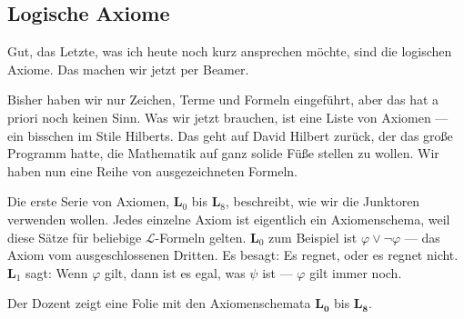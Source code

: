 \begin{ai-global-state-checkpoint-invisible-content}
\end{ai-global-state-checkpoint-invisible-content}

\subsection{Logische Axiome}

\begin{spoken-clean}[01:22:27 - 01:25:27]
Gut, das Letzte, was ich heute noch kurz ansprechen möchte, sind die logischen Axiome. Das machen wir jetzt per Beamer. 

Bisher haben wir nur Zeichen, Terme und Formeln eingeführt, aber das hat a priori noch keinen Sinn. Was wir jetzt brauchen, ist eine Liste von Axiomen --- ein bisschen im Stile Hilberts. Das geht auf David Hilbert zurück, der das große Programm hatte, die Mathematik auf ganz solide Füße stellen zu wollen. Wir haben nun eine Reihe von ausgezeichneten Formeln.

Die erste Serie von Axiomen, \textbf{L$_0$} bis \textbf{L$_8$}, beschreibt, wie wir die Junktoren verwenden wollen. Jedes einzelne Axiom ist eigentlich ein Axiomenschema, weil diese Sätze für beliebige $\mathcal{L}$-Formeln gelten. \textbf{L$_0$} zum Beispiel ist $\varphi \vee \neg\varphi$ --- das Axiom vom ausgeschlossenen Dritten. Es besagt: Es regnet, oder es regnet nicht. \textbf{L$_1$} sagt: Wenn $\varphi$ gilt, dann ist es egal, was $\psi$ ist --- $\varphi$ gilt immer noch.
\end{spoken-clean}

\begin{meta-note}
Der Dozent zeigt eine Folie mit den Axiomenschemata $\mathbf{L_0}$ bis $\mathbf{L_8}$.
\end{meta-note}

